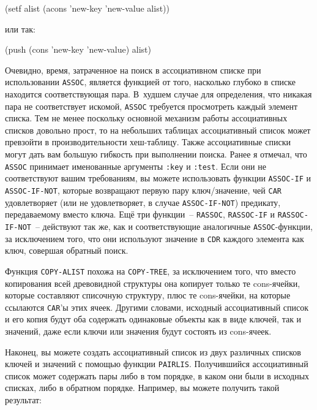 \begin{myverb}
(setf alist (acons 'new-key 'new-value alist))
\end{myverb}

\noindent{}или так:

\begin{myverb}
(push (cons 'new-key 'new-value) alist)
\end{myverb}

Очевидно, время, затраченное на поиск в ассоциативном списке при использовании
\lstinline{ASSOC}, является функцией от того, насколько глубоко в списке находится
соответствующая пара. В~худшем случае для определения, что никакая пара не соответствует
искомой, \lstinline{ASSOC} требуется просмотреть каждый элемент списка. Тем не менее поскольку
основной механизм работы ассоциативных списков довольно прост, то на небольших таблицах
ассоциативный список может превзойти в производительности хеш-таблицу.  Также
ассоциативные списки могут дать вам большую гибкость при выполнении поиска. Ранее я
отмечал, что \lstinline{ASSOC} принимает именованные аргументы \lstinline{:key} и \lstinline{:test}. Если
они не соответствуют вашим требованиям, вы можете использовать функции \lstinline{ASSOC-IF} и
\lstinline{ASSOC-IF-NOT}, которые возвращают первую пару ключ/значение, чей \lstinline{CAR}
удовлетворяет (или не удовлетворяет, в случае \lstinline{ASSOC-IF-NOT}) предикату,
передаваемому вместо ключа. Ещё три функции~-- \lstinline{RASSOC}, \lstinline{RASSOC-IF} и
\lstinline{RASSOC-IF-NOT}~-- действуют так же, как и соответствующие аналогичные
\lstinline{ASSOC}-функции, за исключением того, что они используют значение в \lstinline{CDR}
каждого элемента как ключ, совершая обратный поиск.

Функция \lstinline{COPY-ALIST} похожа на \lstinline{COPY-TREE}, за исключением того, что вместо
копирования всей древовидной структуры она копирует только те cons-ячейки, которые
составляют списочную структуру, плюс те cons-ячейки, на которые ссылаются \lstinline{CAR}'ы
этих ячеек. Другими словами, исходный ассоциативный список и его копия будут оба содержать
одинаковые объекты как в виде ключей, так и значений, даже если ключи или значения будут
состоять из cons-ячеек.

Наконец, вы можете создать ассоциативный список из двух различных списков ключей и значений
с помощью функции \lstinline{PAIRLIS}. Получившийся ассоциативный список может содержать пары
либо в том порядке, в каком они были в исходных списках, либо в обратном
порядке. Например, вы можете получить такой результат:

